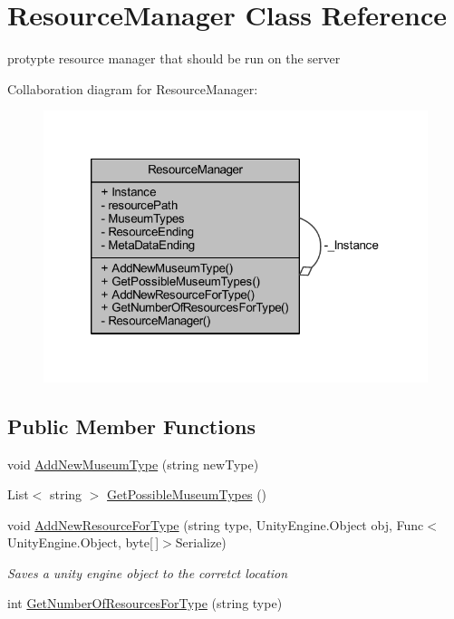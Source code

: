 \hypertarget{class_resource_manager}{}\section{Resource\+Manager Class Reference}
\label{class_resource_manager}


protypte resource manager that should be run on the server  




Collaboration diagram for Resource\+Manager\+:
\nopagebreak
\begin{figure}[H]
\begin{center}
\leavevmode
\includegraphics[width=320pt]{class_resource_manager__coll__graph}
\end{center}
\end{figure}
\subsection*{Public Member Functions}
\begin{DoxyCompactItemize}
\item 
void \mbox{\hyperlink{class_resource_manager_ad36cc6bc6286e385b6b51cca3a3284a2}{Add\+New\+Museum\+Type}} (string new\+Type)
\item 
List$<$ string $>$ \mbox{\hyperlink{class_resource_manager_a72e9243fdaf77f0fb479f0cf4070ea22}{Get\+Possible\+Museum\+Types}} ()
\item 
void \mbox{\hyperlink{class_resource_manager_a00d051848c81ffb1dbb180861895b127}{Add\+New\+Resource\+For\+Type}} (string type, Unity\+Engine.\+Object obj, Func$<$ Unity\+Engine.\+Object, byte\mbox{[}$\,$\mbox{]}$>$Serialize)
\begin{DoxyCompactList}\small\item\em Saves a unity engine object to the corretct location \end{DoxyCompactList}\item 
int \mbox{\hyperlink{class_resource_manager_a9ed8a67faa621d30d9790c0847f45a72}{Get\+Number\+Of\+Resources\+For\+Type}} (string type)
\end{DoxyCompactItemize}
